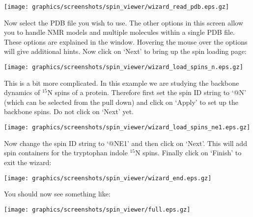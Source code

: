 \begin{minipage}[h]{\linewidth}
\centerline{\texttt{[image: graphics/screenshots/spin\_viewer/wizard\_read\_pdb.eps.gz]}}
\end{minipage}

Now select the PDB file you wish to use.  The other options in this screen allow you to handle NMR models and multiple molecules within a single PDB file.  These options are explained in the window.  Hovering the mouse over the options will give additional hints.  Now click on `Next' to bring up the spin loading page:

\begin{minipage}[h]{\linewidth}
\centerline{\texttt{[image: graphics/screenshots/spin\_viewer/wizard\_load\_spins\_n.eps.gz]}}
\end{minipage}

This is a bit more complicated.  In this example we are studying the backbone dynamics of $^{15}$N spins of a protein.  Therefore first set the spin ID string to `@N' (which can be selected from the pull down) and click on `Apply' to set up the backbone spins.  Do not click on `Next' yet.


\begin{minipage}[h]{\linewidth}
\centerline{\texttt{[image: graphics/screenshots/spin\_viewer/wizard\_load\_spins\_ne1.eps.gz]}}
\end{minipage}

Now change the spin ID string to `@NE1' and then click on `Next'.  This will add spin containers for the tryptophan indole $^{15}$N spins.  Finally click on `Finish' to exit the wizard:

\begin{minipage}[h]{\linewidth}
\centerline{\texttt{[image: graphics/screenshots/spin\_viewer/wizard\_end.eps.gz]}}
\label{figure: spin viewer end}
\end{minipage}

You should now see something like:

\begin{minipage}[h]{\linewidth}
\centerline{\texttt{[image: graphics/screenshots/spin\_viewer/full.eps.gz]}}
\end{minipage}




